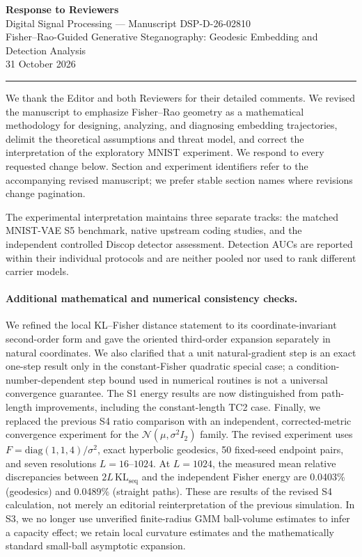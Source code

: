 \documentclass[12pt,a4paper]{article}
\begin{document}


\begin{center}
{\Large\bfseries Response to Reviewers}\\[0.5em]
{\large Digital Signal Processing --- Manuscript DSP-D-26-02810}\\[0.3em]
{\large Fisher--Rao-Guided Generative Steganography: Geodesic Embedding and Detection Analysis}\\[1em]
{\normalsize 31 October 2026}
\end{center}

\hrule
\vspace{1em}

\noindent We thank the Editor and both Reviewers for their detailed comments. We revised the manuscript to emphasize Fisher--Rao geometry as a mathematical methodology for designing, analyzing, and diagnosing embedding trajectories, delimit the theoretical assumptions and threat model, and correct the interpretation of the exploratory MNIST experiment. We respond to every requested change below. Section and experiment identifiers refer to the accompanying revised
manuscript; we prefer stable section names where revisions change pagination.

The experimental interpretation maintains three separate tracks: the
matched MNIST-VAE S5 benchmark, native upstream coding studies, and the
independent controlled Discop detector assessment. Detection AUCs are
reported within their individual protocols and are neither pooled nor used
to rank different carrier models.

\paragraph{Additional mathematical and numerical consistency checks.}
We refined the local KL--Fisher distance statement to its coordinate-invariant
second-order form and gave the oriented third-order expansion separately in
natural coordinates. We also clarified that a unit natural-gradient step is
an exact one-step result only in the constant-Fisher quadratic special case;
a condition-number-dependent step bound used in numerical routines is not a
universal convergence guarantee. The S1 energy results are now distinguished
from path-length improvements, including the constant-length TC2 case.
Finally, we replaced the previous S4 ratio comparison with an
independent, corrected-metric convergence experiment for the
$\mathcal{N}(\mu,\sigma^2I_2)$ family. The revised experiment uses
$F=\mathrm{diag}(1,1,4)/\sigma^2$, exact hyperbolic geodesics,
50 fixed-seed endpoint pairs, and seven resolutions $L=16$--$1024$.
At $L=1024$, the measured mean relative discrepancies between
$2L\,\mathrm{KL}_{\mathrm{seq}}$ and the independent Fisher energy
are 0.0403\% (geodesics) and 0.0489\% (straight paths).
These are results of the revised S4 calculation, not merely an editorial
reinterpretation of the previous simulation. In S3, we no longer use
unverified finite-radius GMM ball-volume estimates to infer a capacity
effect; we retain local curvature estimates and the mathematically
standard small-ball asymptotic expansion.
\end{document}
